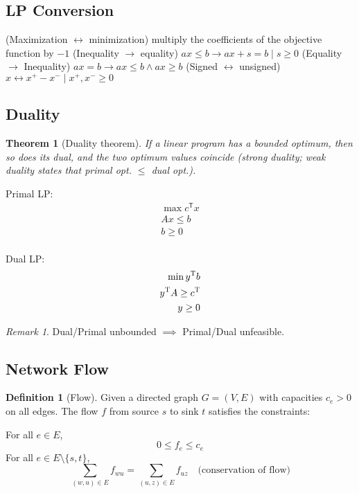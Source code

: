 \documentclass[11pt]{article}
\newtheorem{theorem}{Theorem}[section]
\theoremstyle{definition}
\newtheorem{definition}{Definition}[section]
\theoremstyle{remark}
\newtheorem*{remark}{Remark}
\begin{document}
\subsection{LP Conversion}
\begin{outline}[enumerate]
\1 (Maximization $\leftrightarrow$ minimization) multiply the
coefficients of the objective function by $-1$
\1 (Inequality $\to$ equality) $ax\leq b \to ax+s = b \mid s \geq 0$
\1 (Equality $\to$ Inequality) $ax=b \to ax\leq b \wedge ax\geq b$
\1 (Signed $\leftrightarrow$ unsigned) $x \leftrightarrow x^+ - x^- \mid x^+,x^- \geq 0$
\end{outline}

\subsection{Duality}
\begin{theorem}[Duality theorem]
If a linear program has a bounded optimum, then so does its dual, and the
two optimum values coincide (strong duality; weak duality states that primal opt. $\leq$ dual opt.).
\end{theorem}

\noindent
\begin{minipage}{0.49\textwidth}
Primal LP:
\begin{align*}
\max c^\textsf{T} x\\
Ax \leq b  \\
b \geq 0 \\
\end{align*}
\end{minipage}
\noindent
\begin{minipage}{0.49\textwidth}
Dual LP:
\begin{align*}
\min y^\textsc{T} b\\
y^\textsc{T} A \geq c^\textsc{T} \\
y \geq 0 \\
\end{align*}
\end{minipage}
\begin{remark}
Dual/Primal unbounded $\implies$ Primal/Dual unfeasible.
\end{remark}

\subsection{Network Flow}
\begin{definition}[Flow] Given a directed graph $G=(V,E)$ with capacities $c_e>0$ on all edges. The flow $f$ from source $s$ to sink $t$ satisfies the constraints:
\begin{outline}[enumerate]
\1 For all $e\in E$, 
$$0\leq f_e\leq c_e$$ 
\1 For all $e\in E\setminus\{s,t\}$,
$$\sum_{(w,u)\in E} f_{wu} = \sum_{(u,z)\in E} f_{uz} \quad \text{(conservation of flow)}$$
\end{outline}
\end{definition}
\end{document}
